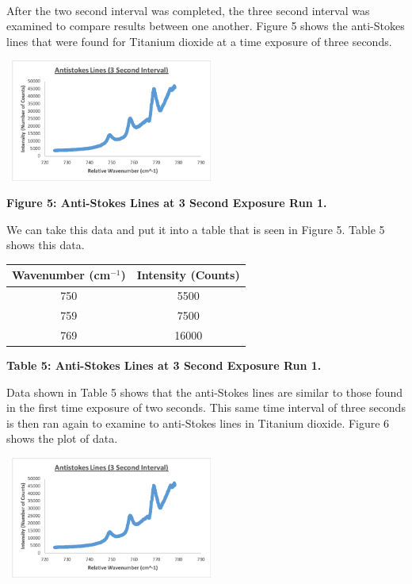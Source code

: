 \documentclass[]{article}
\begin{document}
\begin{multicols}{2}
\paragraph{}
\setlength{\parskip}{1em}
After the two second interval was completed, the three second interval was examined to compare results between one another. Figure 5 shows the anti-Stokes lines that were found for Titanium dioxide at a time exposure of three seconds.
\begin{center}
    \includegraphics[width=7cm, height=4cm]{PHYS 331 RS (3 Sec) 1a.png}
    \caption{\textbf{\small{Figure 5:} Anti-Stokes Lines at 3 Second Exposure Run 1.}}
\end{center}
We can take this data and put it into a table that is seen in Figure 5. Table 5 shows this data.
\newline
\begin{tabular}{|c|c|}
    \hline \textbf{Wavenumber (cm$^{-1}$)} & \textbf{Intensity (Counts)} \\ \hline
    750 & 5500 \\ \hline
    759 & 7500 \\ \hline
    769 & 16000 \\ \hline
\end{tabular}
\centerline{\tiny\textbf{{Table 5: Anti-Stokes Lines at 3 Second Exposure Run 1.}}}
\newline
Data shown in Table 5 shows that the anti-Stokes lines are similar to those found in the first time exposure of two seconds. This same time interval of three seconds is then ran again to examine to anti-Stokes lines in Titanium dioxide. Figure 6 shows the plot of data.
\begin{center}
    \includegraphics[width=7cm, height=4cm]{PHYS 331 RS (3 Sec) 2a.png}

\end{center}
\end{multicols}
\end{document}
